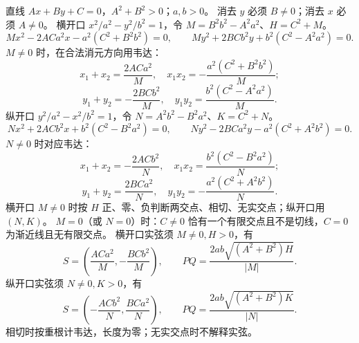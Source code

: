 直线 $Ax+By+C=0$，$A^2+B^2>0$；$a,b>0$。
消去 $y$ 必须 $B\ne0$；消去 $x$ 必须 $A\ne0$。
横开口 $x^2/a^2-y^2/b^2=1$，令 $M=B^2b^2-A^2a^2$、$H=C^2+M$。
\[
 Mx^2-2ACa^2x-a^2(C^2+B^2b^2)=0,\qquad
 My^2+2BCb^2y+b^2(C^2-A^2a^2)=0.
\]
$M\ne0$ 时，在合法消元方向用韦达：
\[
 x_1+x_2=\frac{2ACa^2}{M},\quad x_1x_2=-\frac{a^2(C^2+B^2b^2)}M;
\]
\[
 y_1+y_2=-\frac{2BCb^2}{M},\quad y_1y_2=\frac{b^2(C^2-A^2a^2)}M.
\]
纵开口 $y^2/a^2-x^2/b^2=1$，令 $N=A^2b^2-B^2a^2$、$K=C^2+N$。
\[
 Nx^2+2ACb^2x+b^2(C^2-B^2a^2)=0,\qquad
 Ny^2-2BCa^2y-a^2(C^2+A^2b^2)=0.
\]
$N\ne0$ 时对应韦达：
\[
 x_1+x_2=-\frac{2ACb^2}N,\quad x_1x_2=\frac{b^2(C^2-B^2a^2)}N;
\]
\[
 y_1+y_2=\frac{2BCa^2}N,\quad y_1y_2=-\frac{a^2(C^2+A^2b^2)}N.
\]
横开口 $M\ne0$ 时按 $H$ 正、零、负判断两交点、相切、无实交点；纵开口用 $(N,K)$。
$M=0$（或 $N=0$）时：$C\ne0$ 恰有一个有限交点且不是切线，$C=0$ 为渐近线且无有限交点。
横开口实弦须 $M\ne0,H>0$，有
\[
 S=\left(\frac{ACa^2}M,-\frac{BCb^2}M\right),\qquad PQ=\frac{2ab\sqrt{(A^2+B^2)H}}{|M|}.
\]
纵开口实弦须 $N\ne0,K>0$，有
\[
 S=\left(-\frac{ACb^2}N,\frac{BCa^2}N\right),\qquad PQ=\frac{2ab\sqrt{(A^2+B^2)K}}{|N|}.
\]
相切时按重根计韦达，长度为零；无实交点时不解释实弦。
